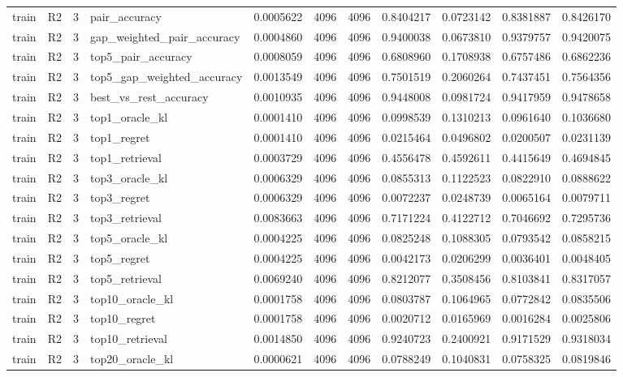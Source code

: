 \begin{tabular}{llrlrrrrrrr}
train & R2 & 3 & pair_accuracy & 0.0005622 & 4096 & 4096 & 0.8404217 & 0.0723142 & 0.8381887 & 0.8426170 \\
train & R2 & 3 & gap_weighted_pair_accuracy & 0.0004860 & 4096 & 4096 & 0.9400038 & 0.0673810 & 0.9379757 & 0.9420075 \\
train & R2 & 3 & top5_pair_accuracy & 0.0008059 & 4096 & 4096 & 0.6808960 & 0.1708938 & 0.6757486 & 0.6862236 \\
train & R2 & 3 & top5_gap_weighted_accuracy & 0.0013549 & 4096 & 4096 & 0.7501519 & 0.2060264 & 0.7437451 & 0.7564356 \\
train & R2 & 3 & best_vs_rest_accuracy & 0.0010935 & 4096 & 4096 & 0.9448008 & 0.0981724 & 0.9417959 & 0.9478658 \\
train & R2 & 3 & top1_oracle_kl & 0.0001410 & 4096 & 4096 & 0.0998539 & 0.1310213 & 0.0961640 & 0.1036680 \\
train & R2 & 3 & top1_regret & 0.0001410 & 4096 & 4096 & 0.0215464 & 0.0496802 & 0.0200507 & 0.0231139 \\
train & R2 & 3 & top1_retrieval & 0.0003729 & 4096 & 4096 & 0.4556478 & 0.4592611 & 0.4415649 & 0.4694845 \\
train & R2 & 3 & top3_oracle_kl & 0.0006329 & 4096 & 4096 & 0.0855313 & 0.1122523 & 0.0822910 & 0.0888622 \\
train & R2 & 3 & top3_regret & 0.0006329 & 4096 & 4096 & 0.0072237 & 0.0248739 & 0.0065164 & 0.0079711 \\
train & R2 & 3 & top3_retrieval & 0.0083663 & 4096 & 4096 & 0.7171224 & 0.4122712 & 0.7046692 & 0.7295736 \\
train & R2 & 3 & top5_oracle_kl & 0.0004225 & 4096 & 4096 & 0.0825248 & 0.1088305 & 0.0793542 & 0.0858215 \\
train & R2 & 3 & top5_regret & 0.0004225 & 4096 & 4096 & 0.0042173 & 0.0206299 & 0.0036401 & 0.0048405 \\
train & R2 & 3 & top5_retrieval & 0.0069240 & 4096 & 4096 & 0.8212077 & 0.3508456 & 0.8103841 & 0.8317057 \\
train & R2 & 3 & top10_oracle_kl & 0.0001758 & 4096 & 4096 & 0.0803787 & 0.1064965 & 0.0772842 & 0.0835506 \\
train & R2 & 3 & top10_regret & 0.0001758 & 4096 & 4096 & 0.0020712 & 0.0165969 & 0.0016284 & 0.0025806 \\
train & R2 & 3 & top10_retrieval & 0.0014850 & 4096 & 4096 & 0.9240723 & 0.2400921 & 0.9171529 & 0.9318034 \\
train & R2 & 3 & top20_oracle_kl & 0.0000621 & 4096 & 4096 & 0.0788249 & 0.1040831 & 0.0758325 & 0.0819846 \\

\end{tabular}
